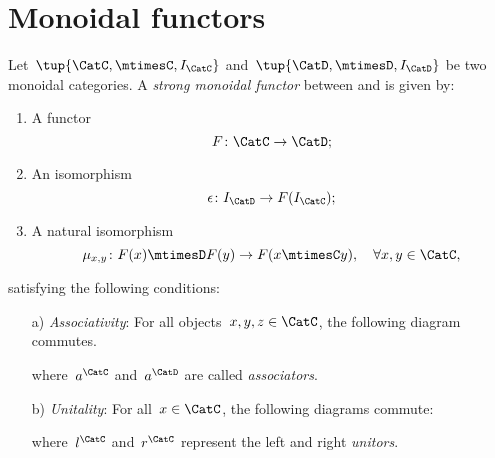 

\section{Monoidal functors}
\label{sec:monoidal-functors}
\begin{ctdefinition}
  \label{def:strong-monoidal-functor}

  Let~$\tup{\CatC,\mtimesC,I_\CatC}$ and~$\tup{\CatD,\mtimesD,I_\CatD}$ be two monoidal categories. A \emph{strong monoidal functor} between \CatC and \CatD is given by:
  \begin{enumerate}
    \item A functor
    \begin{equation}
      F\colon \CatC\to \CatD;
    \end{equation}
    \item An isomorphism
    \begin{equation}
      \epsilon\colon I_\CatD\to F(I_\CatC);
    \end{equation}
    \item A natural isomorphism
    \begin{equation}
      \mu_{x,y}\colon F(x)\mtimesD F(y) \to F(x\mtimesC y),\quad \forall x,y\in \CatC,
    \end{equation}
  \end{enumerate}
  satisfying the following conditions:
  \begin{enumerate}
    \item[a)] \emph{Associativity}: For all objects~$x,y,z\in \CatC$, the following diagram commutes.
    \begin{center}
    \end{center}
    where~$a^\CatC$ and~$a^\CatD$ are called \emph{associators}.
    \item[b)] \emph{Unitality}: For all~$x\in \CatC$, the following diagrams commute:
    \begin{center}
    \end{center}
    where~$l^\CatC$ and~$r^\CatC$ represent the left and right \emph{unitors}.
  \end{enumerate}
\end{ctdefinition}


